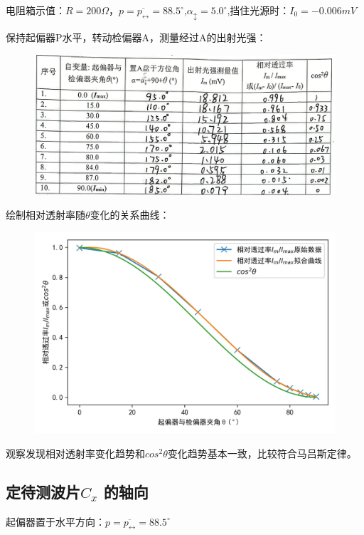 \documentclass[UTF8]{ctexart}
\begin{document}
电阻箱示值：$R=200\Omega$，$p=\overline{p_{\leftrightarrow}}=88.5^\circ$,$\alpha_{\updownarrow}={5.0}^\circ$,挡住光源时：$I_0=-0.006mV$

保持起偏器P水平，转动检偏器A，测量经过A的出射光强：

\begin{figure}[H]
  \centering
  \includegraphics[scale=0.2]{7.jpg}
\end{figure}

绘制相对透射率随$\theta$变化的关系曲线：

\begin{figure}[H]
  \centering
  \includegraphics[scale=0.8]{8.jpg}
\end{figure}

观察发现相对透射率变化趋势和$cos^2\theta$变化趋势基本一致，比较符合马吕斯定律。

\subsection{定待测波片$ C_x$ 的轴向}

起偏器置于水平方向：$p=\overline{p_{\leftrightarrow}}=88.5^\circ$
\end{document}
